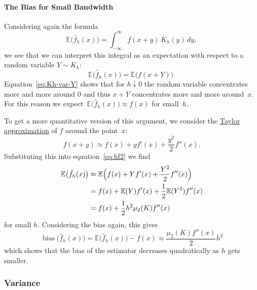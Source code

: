 \documentclass[
  a4paper,
]{article}
\theoremstyle{definition}
\theoremstyle{definition}
\theoremstyle{definition}
\theoremstyle{definition}
\theoremstyle{remark}
\begin{document}
\paragraph{The Bias for Small Bandwidth}\label{the-bias-for-small-bandwidth}

Considering again the formula
\begin{equation*}
    \mathbb{E}\bigl(\hat f_h(x)\bigr)
    = \int_{-\infty}^\infty f(x+y) \, K_h(y) \, dy,
\end{equation*}
we see that we can interpret this integral as an expectation
with respect to a random variable \(Y \sim K_h\):
\begin{equation}
    \mathbb{E}\bigl(\hat f_h(x)\bigr)
    = \mathbb{E}\bigl( f(x+Y) \bigr).  \label{eq:hf2}
\end{equation}
Equation~\eqref{eq:Kh-var-Y} shows that for \(h \downarrow 0\) the random
variable concentrates more and more around \(0\) and thus \(x+Y\) concentrates
more and more around~\(x\). For this reason we
expect~\(\mathbb{E}\bigl(\hat f_h(x)\bigr) \approx f(x)\) for small~\(h\).

To get a more quantitative version of this argument, we consider the
\href{https://en.wikipedia.org/wiki/Taylor\%27s_theorem}{Taylor approximation}
of \(f\) around the point~\(x\):
\begin{equation*}
  f(x + y)
  \approx f(x) + y f'(x) + \frac{y^2}{2} f''(x).
\end{equation*}
Substituting this into equation~\eqref{eq:hf2} we find
\begin{align*}
    \mathbb{E}\bigl(\hat f_h(x)\bigr)
    &\approx \mathbb{E}\Bigl( f(x) + Y f'(x) + \frac{Y^2}{2} f''(x) \Bigr) \\
    &= f(x) + \mathbb{E}(Y) f'(x) + \frac12 \mathbb{E}(Y^2) f''(x) \\
    &= f(x) + \frac12 h^2 \mu_2(K) f''(x)
\end{align*}
for small \(h\). Considering the bias again, this gives
\begin{equation}
  \mathop{\mathrm{bias}}\bigl( \hat f_h(x) \bigr)
  = \mathbb{E}\bigl( \hat f_h(x) \bigr) - f(x)
  \approx \frac{\mu_2(K) f''(x)}{2} h^2  \label{eq:fhatbias}
\end{equation}
which shows that the bias of the estimator decreases quadratically
as \(h\) gets smaller.

\subsubsection{Variance}\label{X02-error-var}
\end{document}

